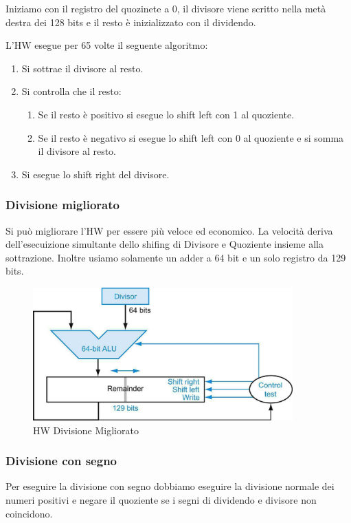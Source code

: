 Iniziamo con il registro del quozinete a 0, il divisore viene scritto nella metà destra dei 128 bits e il resto è
 inizializzato con il dividendo.

L'HW esegue per 65 volte il seguente algoritmo:
\begin{enumerate}
    \item Si sottrae il divisore al resto.
    \item Si controlla che il resto:
    \begin{enumerate}
        \item Se il resto è positivo si esegue lo shift left con 1 al quoziente.
        \item Se il resto è negativo si esegue lo shift left con 0 al quoziente e si somma il divisore al resto. 
    \end{enumerate}
    \item Si esegue lo shift right del divisore.
\end{enumerate}

\subsubsection{Divisione migliorato}
Si può migliorare l'HW per essere più veloce ed economico. La velocità deriva dell'esecuizione simultante dello 
shifing di Divisore e Quoziente insieme alla sottrazione.
Inoltre usiamo solamente un adder a 64 bit e un solo registro da 129 bits.

\begin{figure}[H]
    \centering
    \includegraphics[width=100mm,scale=1.5]{pictures/schema-divisione-bello.png}
    \caption{HW Divisione Migliorato}
    \label{fig:hw-division-improved}
\end{figure}

\subsubsection{Divisione con segno}
Per eseguire la divisione con segno dobbiamo eseguire la divisione normale dei numeri positivi e negare il quoziente 
se i segni di dividendo e divisore non coincidono.

